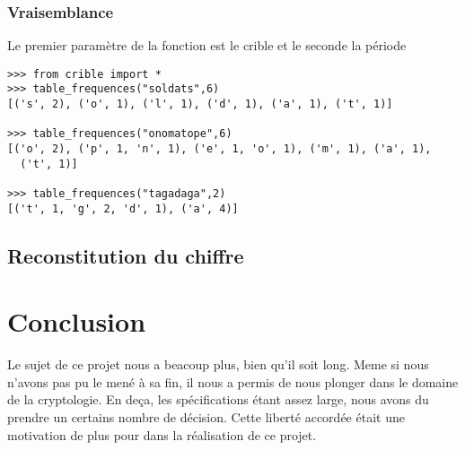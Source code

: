 \documentclass[a4paper, 11pt]{article}
\begin{document}
\subsubsection{Vraisemblance}

Le premier paramètre de la fonction est le crible et le seconde la période

\begin{lstlisting}
>>> from crible import *
>>> table_frequences("soldats",6)
[('s', 2), ('o', 1), ('l', 1), ('d', 1), ('a', 1), ('t', 1)]

>>> table_frequences("onomatope",6)
[('o', 2), ('p', 1, 'n', 1), ('e', 1, 'o', 1), ('m', 1), ('a', 1),
  ('t', 1)]

>>> table_frequences("tagadaga",2)
[('t', 1, 'g', 2, 'd', 1), ('a', 4)]
\end{lstlisting}


\subsection{Reconstitution du chiffre}


\section{Conclusion}

Le sujet de ce projet nous a beacoup plus, bien qu'il soit long.
Meme si nous n'avons pas pu le mené à sa fin, il nous a permis de nous
plonger dans le domaine de la cryptologie.
En deça, les spécifications étant assez large, nous avons du prendre
un certains nombre de décision.
Cette liberté accordée était une motivation de plus pour dans la
réalisation de ce projet.
\end{document}
